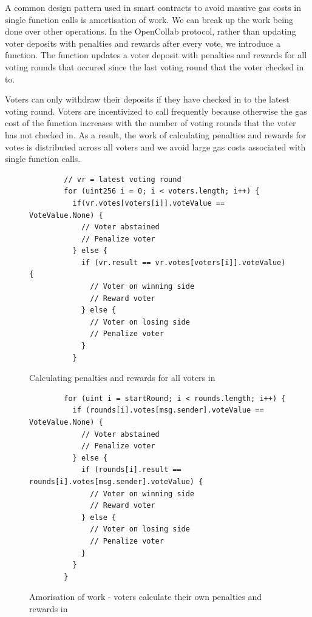 A common design pattern used in smart contracts to avoid massive gas costs in
single function calls is amortisation of work\cite{amortisationWork}. We can
break up the work being done over other operations. In the OpenCollab protocol,
rather than updating voter deposits with penalties and rewards after every vote,
we introduce a  function. The function updates a voter
deposit with penalties and rewards for all voting rounds that occured since the
last voting round that the voter checked in to.

Voters can only withdraw their deposits if they have checked in to the latest voting round. Voters are
incentivized to call  frequently because otherwise the
gas cost of the function increases with the number of voting rounds that the
voter has not checked in. As a result, the work of calculating penalties and rewards for votes is distributed across
all voters and we avoid large gas costs associated with single function calls.

\begin{figure}
  \begin{minipage}{\textwidth}
    \begin{framed}
      \begin{lstlisting}
        // vr = latest voting round
        for (uint256 i = 0; i < voters.length; i++) {
          if(vr.votes[voters[i]].voteValue == VoteValue.None) {
            // Voter abstained
            // Penalize voter
          } else {
            if (vr.result == vr.votes[voters[i]].voteValue) {
              // Voter on winning side
              // Reward voter
            } else {
              // Voter on losing side
              // Penalize voter
            }
          }
        \end{lstlisting}
    \end{framed}
  \end{minipage}
  \caption{Calculating penalties and rewards for all voters in }
\end{figure}

\begin{figure}
  \begin{minipage}{\textwidth}
    \begin{framed}
      \begin{lstlisting}
        for (uint i = startRound; i < rounds.length; i++) {
          if (rounds[i].votes[msg.sender].voteValue == VoteValue.None) {
            // Voter abstained
            // Penalize voter
          } else {
            if (rounds[i].result == rounds[i].votes[msg.sender].voteValue) {
              // Voter on winning side
              // Reward voter
            } else {
              // Voter on losing side
              // Penalize voter
            }
          }
        }
      \end{lstlisting}
    \end{framed}
  \end{minipage}
  \caption{Amorisation of work - voters calculate their own penalties and
    rewards in }
\end{figure}

